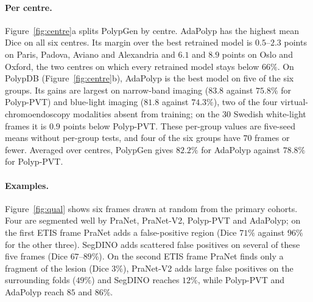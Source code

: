 \documentclass{ieeeaccess}
\begin{document}
\begin{table}[!t]
  \centering
  \caption{\textbf{Secondary metrics on the primary cohorts and PolypDB.} Boundary F1 (BF1, \%, contours within $2$ pixels; higher is better), HD95 (pixels at $352\times352$; lower is better) and failure rate (\% of frames with Dice below $50\%$; lower is better); means over $5$ seeds. \textbf{Bold}: best in column.}
  \label{tab:secondary}
  \vspace{2pt}
  \setlength{\tabcolsep}{3.5pt}
\end{table}

\paragraph{Per centre.} Figure~\ref{fig:centre}a splits PolypGen by centre. AdaPolyp has the highest mean Dice on all six centres. Its margin over the best retrained model is $0.5$--$2.3$ points on Paris, Padova, Aviano and Alexandria and $6.1$ and $8.9$ points on Oslo and Oxford, the two centres on which every retrained model stays below $66\%$. On PolypDB (Figure~\ref{fig:centre}b), AdaPolyp is the best model on five of the six groups. Its gains are largest on narrow-band imaging ($83.8$ against $75.8\%$ for Polyp-PVT) and blue-light imaging ($81.8$ against $74.3\%$), two of the four virtual-chromoendoscopy modalities absent from training; on the $30$ Swedish white-light frames it is $0.9$ points below Polyp-PVT. These per-group values are five-seed means without per-group tests, and four of the six groups have $70$ frames or fewer. Averaged over centres, PolypGen gives $82.2\%$ for AdaPolyp against $78.8\%$ for Polyp-PVT.

\paragraph{Examples.} Figure~\ref{fig:qual} shows six frames drawn at random from the primary cohorts. Four are segmented well by PraNet, PraNet-V2, Polyp-PVT and AdaPolyp; on the first ETIS frame PraNet adds a false-positive region (Dice $71\%$ against $96\%$ for the other three). SegDINO adds scattered false positives on several of these five frames (Dice $67$--$89\%$). On the second ETIS frame PraNet finds only a fragment of the lesion (Dice $3\%$), PraNet-V2 adds large false positives on the surrounding folds ($49\%$) and SegDINO reaches $12\%$, while Polyp-PVT and AdaPolyp reach $85$ and $86\%$.
\end{document}
